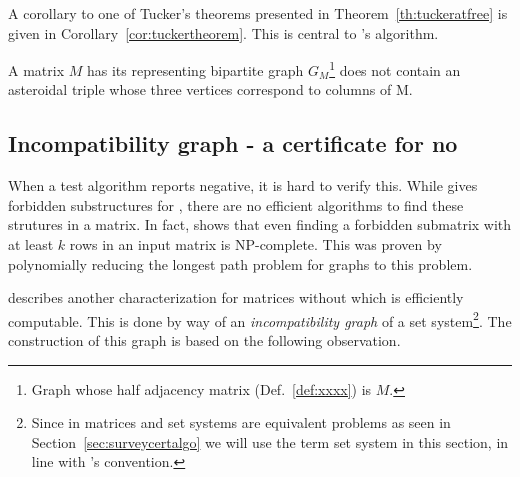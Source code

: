 A corollary to one of Tucker's theorems presented in
Theorem~\ref{th:tuckeratfree} is given in
Corollary~\ref{cor:tuckertheorem}. This is central to \cite{d08phd}'s
algorithm.

\begin{corollary}
  \label{cor:tuckertheorem}
  A matrix $M$ has \COP \iff its representing bipartite graph
  $G_M$\footnote{Graph whose half adjacency matrix
    (Def.~\ref{def:xxxx}) is $M$.} does not contain an asteroidal
  triple whose three vertices correspond to columns of M.
\end{corollary}






\subsection{Incompatibility graph - a certificate for no \COP}

When a \COP test algorithm reports negative, it is hard to verify
this. While \cite{at72} gives forbidden substructures for \COP, there
are no efficient algorithms to find these strutures in a matrix. In
fact, \cite{v82} shows that even finding a forbidden submatrix with at
least $k$ rows in an input matrix is NP-complete. This was proven by
polynomially reducing the longest path problem for graphs to this
problem.

\cite{mcc04} describes another characterization for matrices without
\COP which is efficiently computable. This is done by way of an {\em
  incompatibility graph} of a set system\footnote{Since \COP in
  matrices and set systems are equivalent problems as seen in
  Section~\ref{sec:surveycertalgo} we will use the term set system
  in this section, in line with \cite{mcc04}'s convention.}. The construction of this graph is based on the following
observation. 

